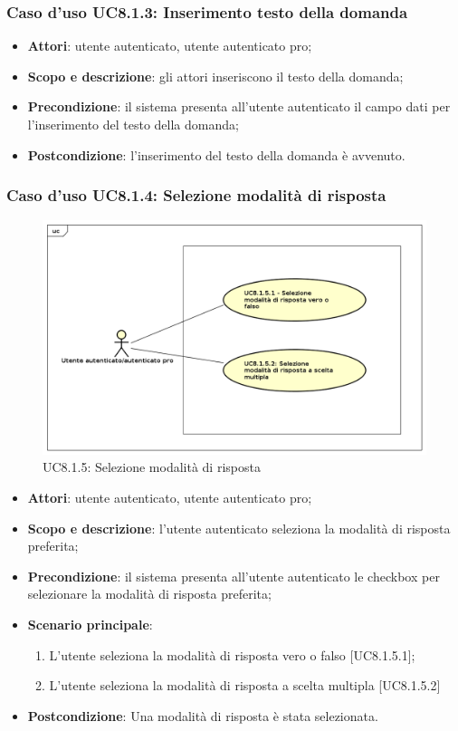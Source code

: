 	\subsubsection{Caso d'uso UC8.1.3: Inserimento testo della domanda}
	\begin{itemize}
		\item
			\textbf{Attori}: utente autenticato, utente autenticato pro;
		\item
			\textbf{Scopo e descrizione}: gli attori inseriscono il testo della domanda;
		\item		
			\textbf{Precondizione}: il sistema presenta all'utente autenticato il campo dati per l'inserimento del testo della domanda;
		\item
			\textbf{Postcondizione}: l'inserimento del testo della domanda è avvenuto.
	\end{itemize}
	\subsubsection{Caso d'uso UC8.1.4: Selezione modalità di risposta}
	\label{UC8.1.5}
	\begin{figure}[h]
		\centering
			\includegraphics[scale=0.5,keepaspectratio]{UML/UC8_1_5.png}
		\caption{UC8.1.5: Selezione modalità di risposta}
	\end{figure}
	\FloatBarrier
	\begin{itemize}
		\item
			\textbf{Attori}: utente autenticato, utente autenticato pro;
		\item
			\textbf{Scopo e descrizione}: l'utente autenticato seleziona la modalità di risposta preferita;
		\item		
			\textbf{Precondizione}: il sistema presenta all'utente autenticato le checkbox per selezionare la modalità di risposta preferita;
		\item
			\textbf{Scenario principale}:
	       		\begin{enumerate}
					\item
					L'utente seleziona la modalità di risposta vero o falso [UC8.1.5.1];
					\item
					L'utente seleziona la modalità di risposta a scelta multipla [UC8.1.5.2]	       		
	       		\end{enumerate}
		\item
			\textbf{Postcondizione}: Una modalità di risposta è stata selezionata.
	\end{itemize}
